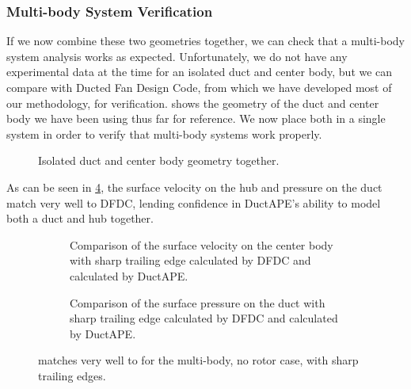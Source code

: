 \subsubsection{Multi-body System Verification}

If we now combine these two geometries together, we can check that a multi-body system analysis works as expected.
%
Unfortunately, we do not have any experimental data at the time for an isolated duct and center body, but we can compare with Ducted Fan Design Code, from which we have developed most of our methodology, for verification.
%
 shows the geometry of the duct and center body we have been using thus far for reference.
%
We now place both in a single system in order to verify that multi-body systems work properly.

\begin{figure}[hb!]
    \centering
        \caption{Isolated duct and center body geometry together.}
    \label{fig:ducthubvalgeom}
\end{figure}
%
As can be seen in \cref{fig:dfdclewiscomp}, the surface velocity on the hub and pressure on the duct match very well to DFDC, lending confidence in DuctAPE's ability to model both a duct and hub together.

\begin{figure}[htb]
     \centering
     \begin{subfigure}[b]{0.45\textwidth}
         \raggedright
         \caption{Comparison of the surface velocity on the center body with sharp trailing edge calculated by DFDC and calculated by DuctAPE.}
        \label{fig:dfdclewisvel}
     \end{subfigure}
     \hfill
     \begin{subfigure}[b]{0.45\textwidth}
         \raggedright
         \caption{Comparison of the surface pressure on the duct with sharp trailing edge calculated by DFDC and calculated by DuctAPE.}
         \label{fig:dfdclewiscp}
     \end{subfigure}
     \caption{ matches very well to  for the multi-body, no rotor case, with sharp trailing edges.}
     \label{fig:dfdclewiscomp}
\end{figure}


